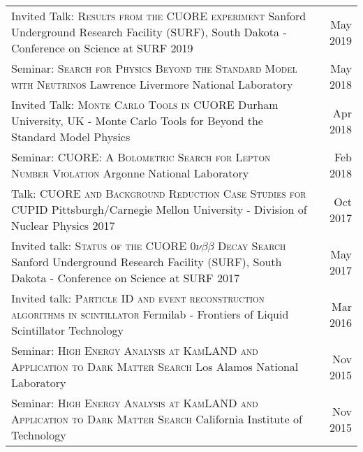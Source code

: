 \documentclass[11pt]{article} %
\begin{document}
\noindent\begin{tabularx}{\linewidth}{@{{}\textbullet\enskip}X@{\quad}r@{}}
Invited Talk: \textsc{Results from the CUORE experiment} \newline Sanford Underground Research Facility (SURF), South Dakota - Conference on Science at SURF 2019 & May 2019\\

\addlinespace[5pt]
Seminar: \textsc{Search for Physics Beyond the Standard Model with Neutrinos} \newline Lawrence Livermore National Laboratory & May  2018\\

\addlinespace[5pt]
Invited Talk: \textsc{Monte Carlo Tools in CUORE} \newline Durham University, UK - Monte Carlo Tools for Beyond the Standard Model Physics & Apr 2018 \\

\addlinespace[5pt]
Seminar: \textsc{CUORE: A Bolometric Search for Lepton Number Violation} \newline Argonne National Laboratory & Feb 2018 \\

\addlinespace[5pt]
Talk: \textsc{CUORE and Background Reduction Case Studies for CUPID} \newline Pittsburgh/Carnegie Mellon University - Division of Nuclear Physics 2017 & Oct 2017 \\

\addlinespace[5pt]
Invited talk: \textsc{Status of the CUORE $0\nu\beta\beta$ Decay Search} \newline Sanford Underground Research Facility (SURF), South Dakota - Conference on Science at SURF 2017 & May 2017 \\

\addlinespace[5pt]
Invited talk: \textsc{Particle ID and event reconstruction algorithms in scintillator} \newline Fermilab - Frontiers of Liquid Scintillator Technology & Mar 2016 \\

\addlinespace[5pt]
Seminar: \textsc{High Energy Analysis at KamLAND and Application to Dark Matter Search} \newline Los Alamos National Laboratory & Nov 2015 \\

\addlinespace[5pt]
Seminar: \textsc{High Energy Analysis at KamLAND and Application to Dark Matter Search} \newline California Institute of Technology & Nov 2015 \\


\end{tabularx}
\end{document}
